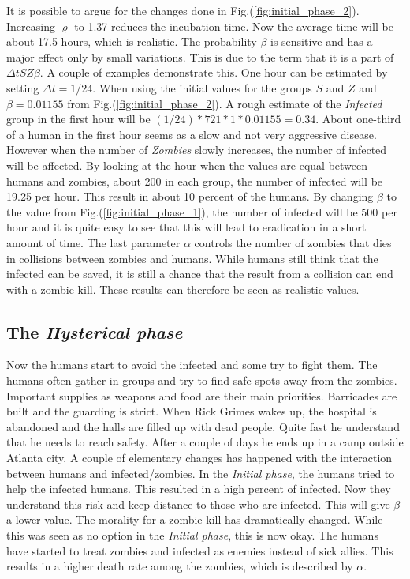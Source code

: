 \documentclass[%
twoside,                 %
final,                   %
chapterprefix=true,      %
open=right               %
10pt]{book}
\begin{document}
It is possible to argue for the changes done in Fig.(\ref{fig:initial_phase_2}). Increasing $\varrho$ to 1.37 reduces the incubation time. Now the average time will be about 17.5 hours, which is realistic. The probability $\beta$ is sensitive and has a major effect only by small variations. This is due to the term that it is a part of $\Delta t SZ \beta$. A couple of examples demonstrate this. One hour can be estimated by setting $\Delta t = 1/24$. When using the initial values for the groups $S$ and $Z$ and $\beta=0.01155$ from Fig.(\ref{fig:initial_phase_2}). A rough estimate of the \emph{Infected} group in the first hour will be $(1/24)*721*1*0.01155=0.34$. About one-third of a human in the first hour seems as a slow and not very aggressive disease. However when the number of \emph{Zombies} slowly increases, the number of infected will be affected. By looking at the hour when the values are equal between humans and zombies, about 200 in each group, the number of infected will be 19.25 per hour. This result in about 10 percent of the humans. By changing $\beta$ to the value from Fig.(\ref{fig:initial_phase_1}), the number of infected will be 500 per hour and it is quite easy to see that this will lead to eradication in a short amount of time. The last parameter $\alpha$ controls the number of zombies that dies in collisions between zombies and humans. While humans still think that the infected can be saved, it is still a chance that the result from a collision can end with a zombie kill. These results can therefore be seen as realistic values.

\subsection{The \emph{Hysterical phase}}
Now the humans start to avoid the infected and some try to fight them. The humans often gather in groups and try to find safe spots away from the zombies. Important supplies as weapons and food are their main priorities. Barricades are built and the guarding is strict. When Rick Grimes wakes up, the hospital is abandoned and the halls are filled up with dead people. Quite fast he understand that he needs to reach safety. After a couple of days he ends up in a camp outside Atlanta city. A couple of elementary changes has happened with the interaction between humans and infected/zombies. In the \emph{Initial phase}, the humans tried to help the infected humans. This resulted in a high percent of infected. Now they understand this risk and keep distance to those who are infected. This will give $\beta$ a lower value. The morality for a zombie kill has dramatically changed. While this was seen as no option in the \emph{Initial phase}, this is now okay. The humans have started to treat zombies and infected as enemies instead of sick allies. This results in a higher death rate among the zombies, which is described by $\alpha$. 
\end{document}
